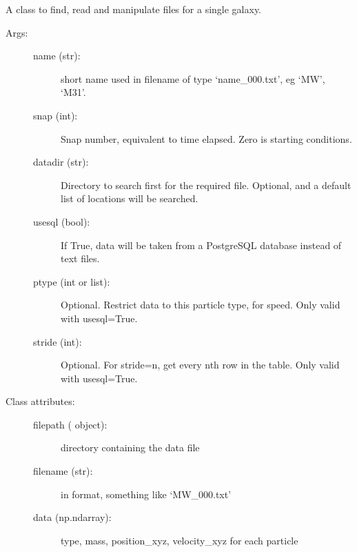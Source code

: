 \documentclass[letterpaper,10pt,english]{sphinxmanual}
\begin{document}
\begin{fulllineitems}
\label{\detokenize{galaxy:galaxy.galaxy.Galaxy}}
A class to find, read and manipulate files for a single galaxy.
\begin{description}
\item[{Args:}] \leavevmode\begin{description}
\item[{name (str):}] \leavevmode
short name used in filename of type ‘name\_000.txt’, eg ‘MW’, ‘M31’.

\item[{snap (int):}] \leavevmode
Snap number, equivalent to time elapsed. Zero is starting conditions.

\item[{datadir (str):}] \leavevmode
Directory to search first for the required file. Optional, and a
default list of locations will be searched.

\item[{usesql (bool):}] \leavevmode
If True, data will be taken from a PostgreSQL database instead of
text files.

\item[{ptype (int or list):}] \leavevmode
Optional. Restrict data to this particle type, for speed. 
Only valid with usesql=True.

\item[{stride (int):}] \leavevmode
Optional. For stride=n, get every nth row in the table.
Only valid with usesql=True.

\end{description}

\item[{Class attributes:}] \leavevmode\begin{description}
\item[{filepath ( object):}] \leavevmode
directory containing the data file

\item[{filename (str):}] \leavevmode
in  format, something like ‘MW\_000.txt’

\item[{data (np.ndarray):}] \leavevmode
type, mass, position\_xyz, velocity\_xyz for each particle


\end{description}
\end{description}
\end{fulllineitems}
\end{document}
